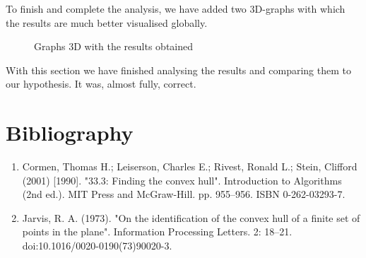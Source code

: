 \documentclass[12pt,a4paper]{article}
\begin{document}
To finish and  complete the analysis, we have added two 3D-graphs with which the results are much better visualised globally.
\begin{figure}[H]
 \centering
 \caption{Graphs 3D with the results obtained}
 \label{f:results_prob}
\end{figure}

With this section we have finished analysing the results and comparing them to our hypothesis. It was, almost fully, correct. 

\section*{Bibliography}
\begin{enumerate}
\item Cormen, Thomas H.; Leiserson, Charles E.; Rivest, Ronald L.; Stein, Clifford (2001) [1990]. "33.3: Finding the convex hull". Introduction to Algorithms (2nd ed.). MIT Press and McGraw-Hill. pp. 955–956. ISBN 0-262-03293-7.

\item Jarvis, R. A. (1973). "On the identification of the convex hull of a finite set of points in the plane". Information Processing Letters. 2: 18–21. doi:10.1016/0020-0190(73)90020-3.
\end{enumerate}
\end{document}

